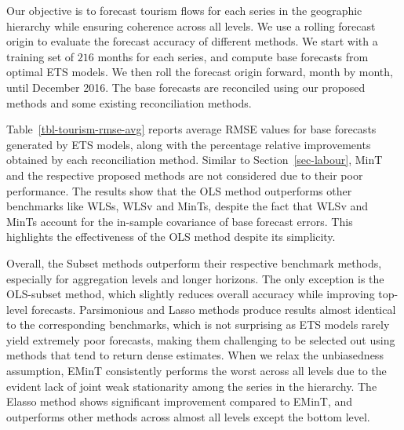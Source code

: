\documentclass[
  11pt]{article}
\theoremstyle{plain}
\theoremstyle{remark}
\begin{document}
Our objective is to forecast tourism flows for each series in the
geographic hierarchy while ensuring coherence across all levels. We use
a rolling forecast origin to evaluate the forecast accuracy of different
methods. We start with a training set of \(216\) months for each series,
and compute base forecasts from optimal ETS models. We then roll the
forecast origin forward, month by month, until December 2016. The base
forecasts are reconciled using our proposed methods and some existing
reconciliation methods.

Table~\ref{tbl-tourism-rmse-avg} reports average RMSE values for base
forecasts generated by ETS models, along with the percentage relative
improvements obtained by each reconciliation method. Similar to
Section~\ref{sec-labour}, MinT and the respective proposed methods are
not considered due to their poor performance. The results show that the
OLS method outperforms other benchmarks like WLSs, WLSv and MinTs,
despite the fact that WLSv and MinTs account for the in-sample
covariance of base forecast errors. This highlights the effectiveness of
the OLS method despite its simplicity.

Overall, the Subset methods outperform their respective benchmark
methods, especially for aggregation levels and longer horizons. The only
exception is the OLS-subset method, which slightly reduces overall
accuracy while improving top-level forecasts. Parsimonious and Lasso
methods produce results almost identical to the corresponding
benchmarks, which is not surprising as ETS models rarely yield extremely
poor forecasts, making them challenging to be selected out using methods
that tend to return dense estimates. When we relax the unbiasedness
assumption, EMinT consistently performs the worst across all levels due
to the evident lack of joint weak stationarity among the series in the
hierarchy. The Elasso method shows significant improvement compared to
EMinT, and outperforms other methods across almost all levels except the
bottom level.
\end{document}
